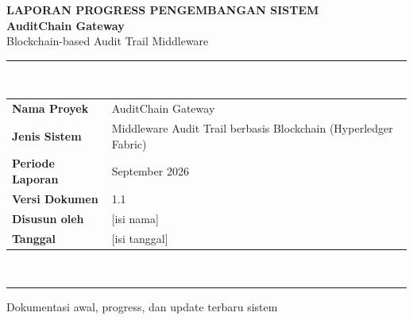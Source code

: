 \documentclass[12pt,a4paper]{report}
\begin{document}
\begin{titlepage}
    \centering
    \vspace*{1.3cm}
    {\Large \textbf{LAPORAN PROGRESS PENGEMBANGAN SISTEM}}\\[0.4cm]
    {\LARGE \textbf{AuditChain Gateway}}\\[0.2cm]
    {\large Blockchain-based Audit Trail Middleware}\\[1.2cm]

    \rule{0.78\textwidth}{0.5pt}\\[0.8cm]
    \begin{tabular}{>{\bfseries}p{4cm}p{8cm}}
        Nama Proyek & AuditChain Gateway \\
        Jenis Sistem & Middleware Audit Trail berbasis Blockchain (Hyperledger Fabric) \\
        Periode Laporan & September 2026 \\
        Versi Dokumen & 1.1 \\
        Disusun oleh & [isi nama] \\
        Tanggal & [isi tanggal] \\
    \end{tabular}\\[0.8cm]
    \rule{0.78\textwidth}{0.5pt}

    \vfill
    {\normalsize Dokumentasi awal, progress, dan update terbaru sistem}
\end{titlepage}

\tableofcontents
\newpage








\end{document}
